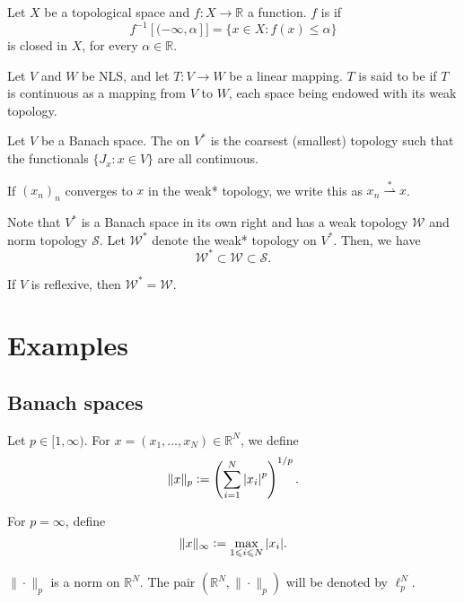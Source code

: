 \documentclass[12pt]{article}	%
\newcommand{\weak}{\rightharpoonup}
\newcommand{\weaks}{\overset{\ast}{\weak}}
\begin{document}
\begin{defn}
	Let $X$ be a topological space and $f : X \to \mathbb{R}$ a function. $f$ is  if
	\begin{equation*} 
		f^{-1}[(-\infty, \alpha]] = \{x \in X : f(x) \le \alpha\}
	\end{equation*}
	is closed in $X$, for every $\alpha \in \mathbb{R}$.
\end{defn}

\begin{defn}
	Let $V$ and $W$ be NLS, and let $T : V \to W$ be a linear mapping. $T$ is said to be  if $T$ is continuous as a mapping from $V$ to $W$, each space being endowed with its weak topology.
\end{defn}

\begin{defn}
	Let $V$ be a Banach space. The  on $V^{\ast}$ is the coarsest (smallest) topology such that the functionals $\{J_{x} : x \in V\}$ are all continuous.

	If $(x_{n})_{n}$ converges to $x$ in the weak* topology, we write this as $x_{n} \weaks x$.
\end{defn}
Note that $V^{\ast}$ is a Banach space in its own right and has a weak topology $\mathcal{W}$ and norm topology $\mathcal{S}$. Let $\mathcal{W}^{\ast}$ denote the weak* topology on $V^{\ast}$. Then, we have
\begin{equation*} 
	\mathcal{W}^{\ast} \subset \mathcal{W} \subset \mathcal{S}.
\end{equation*}

If $V$ is reflexive, then $\mathcal{W}^{\ast} = \mathcal{W}$.

\section{Examples}

\subsection{Banach spaces}

\begin{defn}
	Let $p \in [1, \infty)$. For $x = (x_{1}, \ldots, x_{N}) \in \mathbb{R}^{N}$, we define
	\begin{equation*} 
		\|x\|_{p} \vcentcolon= \left(\sum_{i = 1}^{N} {\left\lvert x_{i} \right\lvert}^{p}\right)^{1/p}.
	\end{equation*}

	For $p = \infty$, define
	\begin{equation*} 
		\|x\|_{\infty} \vcentcolon= \max_{1 \leqslant i \leqslant N} {\left\lvert x_{i} \right\lvert}.
	\end{equation*}

	$\|\cdot\|_{p}$ is a norm on $\mathbb{R}^{N}$. The pair $(\mathbb{R}^{N}, \|\cdot\|_{p})$ will be denoted by $\ell_{p}^{N}$. 
\end{defn}
\end{document}
